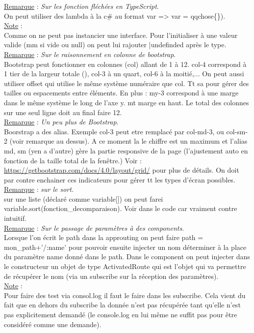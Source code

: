 \documentclass[a4paper,12pt,twoside]{article}
\newcommand{\incode}[1]{{\footnotesize\ttfamily #1}} %
\newcommand{\rem}[2]{\noindent\underline{Remarque} : \textit{#1}.\\ \indent #2}
\newcommand{\note}[1]{\noindent\underline{Note} : \\ \indent #1}
\begin{document}
\rem{Sur les fonction fléchées en TypeScript}{On peut utiliser des lambda à la c\# au format \incode{var => var = qqchose\{\})}.}\\

\note{Comme on ne peut pas instancier une interface. Pour l'initialiser à une valeur valide (mm si vide ou null) on peut lui rajouter \incode{|undefinded} après le type.}\\

\rem{Sur le raisonnement en colonne de bootstrap}{Bootstrap peut fonctionner en colonnes (col) allant de 1 à 12. col-4 correspond à 1 tier de la largeur totale (\frac{4}{12}), col-3 à un quart, col-6 à la moitié,... On peut aussi utiliser offset qui utilise le même système numéraire que col. Tt sa pour gérer des tailles ou espacements entre éléments. En plus : my-3 correspond à une marge dans le même système le long de l'axe y. mt marge en haut. Le total des colonnes sur une seul ligne doit au final faire 12.}\\

\rem{Un peu plus de Bootstrap}{Boorstrap a des alias. Exemple col-3 peut etre remplacé par col-md-3, ou col-sm-2 (voir remarque au dessus). A ce moment la le chiffre est un maximum et l'alias md, sm (yen a d'autre) gère la partie responsive de la page (l'ajustement auto en fonction de la taille total de la fenêtre.) Voir : \url{https://getbootstrap.com/docs/4.0/layout/grid/} pour plus de détails. On doit par contre enchainer ces indicateurs pour gérer tt les types d'écran possibles.}\\

\rem{sur le \incode{sort}}{sur une liste (déclaré comme \incode{variable[]}) on peut farei \incode{variable.sort(fonction\_decomparaison)}. Voir dans le code car vraiment contre intuitif.}\\

\rem{Sur le passage de paramètres à des components}{Lorsque l'on écrit le path dans la approuting on peut faire \incode{path = mon_path+'/:name'} pour pouvoir ensuite injecter un nom déterminer à la place du paramètre name donné dans le path. Dans le component on peut injecter dans le constructeur un objet de type \incode{ActivatedRoute} qui est l'objet qui va permettre de récupérer le nom (via un subscribe sur la réception des paramètres). }\\

\note{Pour faire des test via \incode{consol.log} il faut le faire dans les \incode{subscribe}. Cela vient du fait que en dehors du subscribe la donnée n'est pas récupérée tant qu'elle n'est pas explicitement demandé (le \incode{console.log} en lui même ne suffit pas pour être considéré comme une demande).}\\
\end{document}
